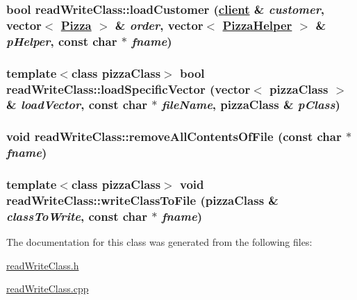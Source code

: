 \hypertarget{classread_write_class_b078183ae301dfe3e5197f25677d3abc}{
\subsubsection[loadCustomer]{\setlength{\rightskip}{0pt plus 5cm}bool read\-Write\-Class::load\-Customer (\hyperlink{classclient}{client} \& {\em customer}, vector$<$ \hyperlink{class_pizza}{Pizza} $>$ \& {\em order}, vector$<$ \hyperlink{class_pizza_helper}{Pizza\-Helper} $>$ \& {\em p\-Helper}, const char $\ast$ {\em fname})}}
\label{classread_write_class_b078183ae301dfe3e5197f25677d3abc}


\hypertarget{classread_write_class_c853fce40cfb6790d054df75b933889f}{
\subsubsection[loadSpecificVector]{\setlength{\rightskip}{0pt plus 5cm}template$<$class pizza\-Class$>$ bool read\-Write\-Class::load\-Specific\-Vector (vector$<$ pizza\-Class $>$ \& {\em load\-Vector}, const char $\ast$ {\em file\-Name}, pizza\-Class \& {\em p\-Class})}}
\label{classread_write_class_c853fce40cfb6790d054df75b933889f}


\hypertarget{classread_write_class_40de8d6c8e60d97ea037a48a0096fcfb}{
\subsubsection[removeAllContentsOfFile]{\setlength{\rightskip}{0pt plus 5cm}void read\-Write\-Class::remove\-All\-Contents\-Of\-File (const char $\ast$ {\em fname})}}
\label{classread_write_class_40de8d6c8e60d97ea037a48a0096fcfb}


\hypertarget{classread_write_class_abb1ed8e2de573d0548c582c8df29de1}{
\subsubsection[writeClassToFile]{\setlength{\rightskip}{0pt plus 5cm}template$<$class pizza\-Class$>$ void read\-Write\-Class::write\-Class\-To\-File (pizza\-Class \& {\em class\-To\-Write}, const char $\ast$ {\em fname})}}
\label{classread_write_class_abb1ed8e2de573d0548c582c8df29de1}




The documentation for this class was generated from the following files:\begin{CompactItemize}
\item 
\hyperlink{read_write_class_8h}{read\-Write\-Class.h}\item 
\hyperlink{read_write_class_8cpp}{read\-Write\-Class.cpp}\end{CompactItemize}
